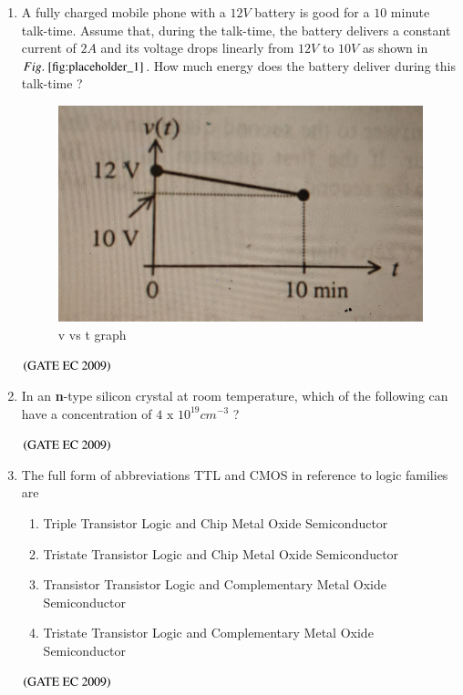 \documentclass[journal,12pt,onecolumn]{IEEEtran}
\theoremstyle{remark}
\begin{document}
\begin{enumerate}[start=1, label={Q\arabic*.}]
\item A fully charged mobile phone with a $12V$ battery is good for a $10$ minute talk-time. Assume that, during the talk-time, the battery delivers a constant current of $2A$ and its voltage drops linearly from $12V$ to $10V$ as shown in $\figref{fig:placeholder_1}$. How much energy does the battery deliver during this talk-time ?
\begin{figure}
    \centering
    \includegraphics[width=0.5\columnwidth]{figs/fig_1.jpg}
    \caption{\centering v vs t graph}
    \label{fig:placeholder_1}
\end{figure}
\begin{enumerate}
\end{enumerate}
\hfill $\left(\text{GATE EC 2009}\right)$

\item In an \textbf{n}-type silicon crystal at room temperature, which of the following can have a concentration of $4 \text{ x } 10^{19}  cm^{-3}$ ?
\begin{enumerate}
\end{enumerate}
\hfill $\left(\text{GATE EC 2009}\right)$

\item The full form of abbreviations TTL and CMOS in reference to logic families are 
\begin{enumerate}
\item Triple Transistor Logic and Chip Metal Oxide Semiconductor
\item Tristate Transistor Logic and Chip Metal Oxide Semiconductor
\item Transistor Transistor Logic and Complementary Metal Oxide Semiconductor
\item Tristate Transistor Logic and Complementary Metal Oxide Semiconductor
\end{enumerate}
\hfill $\left(\text{GATE EC 2009}\right)$


\end{enumerate}
\end{document}

